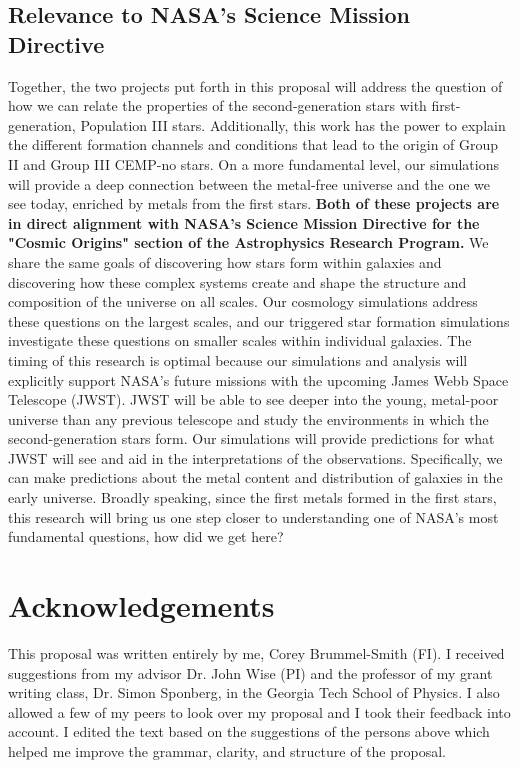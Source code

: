 \documentclass[letterpaper, 12pt]{article}
\begin{document}
\subsection*{Relevance to NASA's Science Mission Directive}
Together, the two projects put forth in this proposal will address the question of how we can relate the properties of the second-generation stars with first-generation, Population III stars. Additionally, this work has the power to explain the different formation channels and conditions that lead to the origin of Group II and Group III CEMP-no stars. On a more fundamental level, our simulations will provide a deep connection between the metal-free universe and the one we see today, enriched by metals from the first stars. \textbf{Both of these projects are in direct alignment with NASA's Science Mission Directive for the "Cosmic Origins" section of the Astrophysics Research Program.} We share the same goals of discovering how stars form within galaxies and discovering how these complex systems create and shape the structure and composition of the universe on all scales. Our cosmology simulations address these questions on the largest scales, and our triggered star formation simulations investigate these questions on smaller scales within individual galaxies. The timing of this research is optimal because our simulations and analysis will explicitly support NASA's future missions with the upcoming James Webb Space Telescope (JWST). JWST will be able to see deeper into the young, metal-poor universe than any previous telescope and study the environments in which the second-generation stars form. Our simulations will provide predictions for what JWST will see and aid in the interpretations of the observations. Specifically, we can make predictions about the metal content and distribution of galaxies in the early universe. Broadly speaking, since the first metals formed in the first stars, this research will bring us one step closer to understanding one of NASA's most fundamental questions, how did we get here?




\section*{Acknowledgements}
This proposal was written entirely by me, Corey Brummel-Smith (FI). I received suggestions from my advisor Dr. John Wise (PI) and the professor of my grant writing class, Dr. Simon Sponberg, in the Georgia Tech School of Physics. I also allowed a few of my peers to look over my proposal and I took their feedback into account. I edited the text based on the suggestions of the persons above which helped me improve the grammar, clarity, and structure of the proposal.
\end{document}
